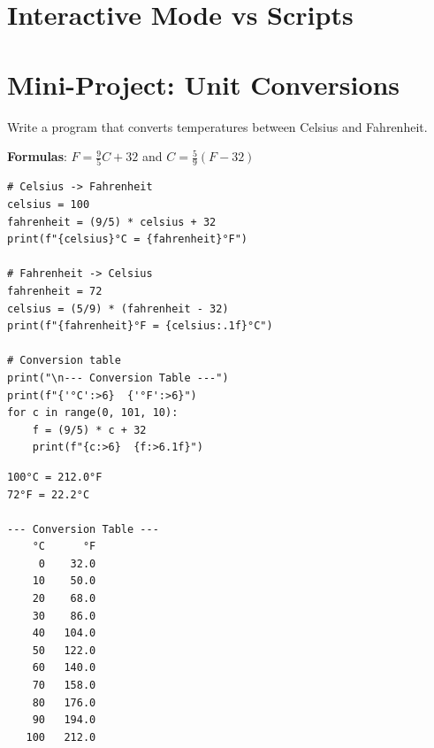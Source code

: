\section{Interactive Mode vs Scripts}

\begin{center}
\end{center}

\section{Mini-Project: Unit Conversions}

\begin{projet}
Write a program that converts temperatures between Celsius and Fahrenheit.

\textbf{Formulas}: $F = \frac{9}{5}C + 32$ and $C = \frac{5}{9}(F - 32)$

\begin{codeblock}[title=\textbf{Python --- Converter}]
\begin{verbatim}
# Celsius -> Fahrenheit
celsius = 100
fahrenheit = (9/5) * celsius + 32
print(f"{celsius}°C = {fahrenheit}°F")

# Fahrenheit -> Celsius
fahrenheit = 72
celsius = (5/9) * (fahrenheit - 32)
print(f"{fahrenheit}°F = {celsius:.1f}°C")

# Conversion table
print("\n--- Conversion Table ---")
print(f"{'°C':>6}  {'°F':>6}")
for c in range(0, 101, 10):
    f = (9/5) * c + 32
    print(f"{c:>6}  {f:>6.1f}")
\end{verbatim}
\end{codeblock}

\begin{codeoutput}
\begin{verbatim}
100°C = 212.0°F
72°F = 22.2°C

--- Conversion Table ---
    °C      °F
     0    32.0
    10    50.0
    20    68.0
    30    86.0
    40   104.0
    50   122.0
    60   140.0
    70   158.0
    80   176.0
    90   194.0
   100   212.0
\end{verbatim}
\end{codeoutput}
\end{projet}

